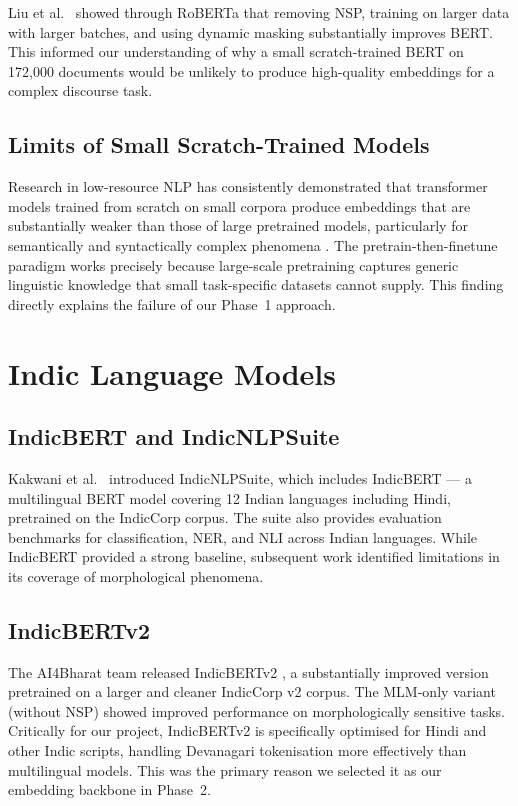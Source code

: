 \documentclass[12pt,a4paper]{report}
\begin{document}
Liu et al.\ \cite{liu2019roberta} showed through RoBERTa that removing NSP, training on larger data with larger batches, and using dynamic masking substantially improves BERT. This informed our understanding of why a small scratch-trained BERT on 172,000 documents would be unlikely to produce high-quality embeddings for a complex discourse task.

\subsection{Limits of Small Scratch-Trained Models}

Research in low-resource NLP has consistently demonstrated that transformer models trained from scratch on small corpora produce embeddings that are substantially weaker than those of large pretrained models, particularly for semantically and syntactically complex phenomena \cite{lauscher2020zero}. The pretrain-then-finetune paradigm works precisely because large-scale pretraining captures generic linguistic knowledge that small task-specific datasets cannot supply. This finding directly explains the failure of our Phase~1 approach.

\section{Indic Language Models}

\subsection{IndicBERT and IndicNLPSuite}

Kakwani et al.\ \cite{kakwani2020indicnlpsuite} introduced IndicNLPSuite, which includes IndicBERT --- a multilingual BERT model covering 12 Indian languages including Hindi, pretrained on the IndicCorp corpus. The suite also provides evaluation benchmarks for classification, NER, and NLI across Indian languages. While IndicBERT provided a strong baseline, subsequent work identified limitations in its coverage of morphological phenomena.

\subsection{IndicBERTv2}

The AI4Bharat team released IndicBERTv2 \cite{doddapaneni2023indicbert}, a substantially improved version pretrained on a larger and cleaner IndicCorp v2 corpus. The MLM-only variant (without NSP) showed improved performance on morphologically sensitive tasks. Critically for our project, IndicBERTv2 is specifically optimised for Hindi and other Indic scripts, handling Devanagari tokenisation more effectively than multilingual models. This was the primary reason we selected it as our embedding backbone in Phase~2.
\end{document}
